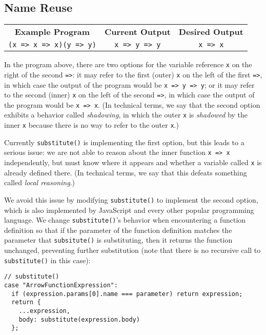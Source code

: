\documentclass[12pt, oneside]{book}
\begin{document}
\subsection{Name Reuse}

\begin{center}
\begin{tabular}{c|c|c}
\textbf{Example Program} & \textbf{Current Output} & \textbf{Desired Output} \\
\texttt{(x => x => x)(y => y)} & \texttt{x => y => y} & \texttt{x => x} \\
\end{tabular}
\end{center}

\noindent In the program above, there are two options for the variable reference \texttt{x} on the right of the second \texttt{=>}: it may refer to the first (outer) \texttt{x} on the left of the first \texttt{=>}, in which case the output of the program would be \texttt{x => y => y}; or it may refer to the second (inner) \texttt{x} on the left of the second \texttt{=>}, in which case the output of the program would be \texttt{x => x}. (In technical terms, we say that the second option exhibits a behavior called \emph{shadowing}, in which the outer \texttt{x} is \emph{shadowed} by the inner \texttt{x} because there is no way to refer to the outer \texttt{x}.)

Currently \texttt{substitute()} is implementing the first option, but this leads to a serious issue: we are not able to reason about the inner function \texttt{x => x} independently, but must know where it appears and whether a variable called \texttt{x} is already defined there. (In technical terms, we say that this defeats something called \emph{local reasoning}.)

We avoid this issue by modifying \texttt{substitute()} to implement the second option, which is also implemented by JavaScript and every other popular programming language. We change \texttt{substitute()}’s behavior when encountering a function definition so that if the parameter of the function definition matches the parameter that \texttt{subsitute()} is substituting, then it returns the function unchanged, preventing further substitution (note that there is no recursive call to \texttt{substitute()} in this case):

\begin{verbatim}
// substitute()
case "ArrowFunctionExpression":
  if (expression.params[0].name === parameter) return expression;
  return {
    ...expression,
    body: substitute(expression.body)
  };
\end{verbatim}
\end{document}
